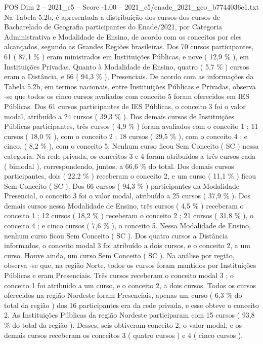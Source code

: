 \begin{textsample}{POS Dim 2 – 2021\_c5 – Score -1.00 – 2021\_c5/enade\_2021\_geo\_b7744036e1.txt}
Na Tabela 5.2b, é apresentada a distribuição dos cursos dos cursos de Bacharelado de Geografia participantes do Enade/2021, por Categoria Administrativa e Modalidade de Ensino, de acordo com os conceitos por eles alcançados, segundo as Grandes Regiões brasileiras.
Dos 70 cursos participantes, 61 ( 87,1 \% ) eram ministrados em Instituições Públicas, e nove ( 12,9 \% ), em Instituições Privadas.
Quanto à Modalidade de Ensino, quatro ( 5,7 \% ) cursos eram a Distância, e 66 ( 94,3 \% ), Presenciais.
De acordo com as informações da Tabela 5.2b, em termos nacionais, entre Instituições Públicas e Privadas, observa -se que todos os cinco cursos avaliados com conceito 5 foram oferecidos em IES Públicas.
Dos 61 cursos participantes de IES Públicas, o conceito 3 foi o valor modal, atribuído a 24 cursos ( 39,3 \% ).
Dos demais cursos de Instituições Públicas participantes, três cursos ( 4,9 \% ) foram avaliados com o conceito 1 ; 11 cursos ( 18,0 \% ), com o conceito 2 ; 18 cursos ( 29,5 \% ), com o conceito 4 ; e cinco, ( 8,2 \% ), com o conceito 5.
Nenhum curso ficou Sem Conceito ( SC ) nessa categoria.
Na rede privada, os conceitos 3 e 4 foram atribuídos a três cursos cada ( bimodal ), correspondendo, juntos, a 66,6 \% do total.
Dos demais cursos participantes, dois ( 22,2 \% ) receberam o conceito 2, e um curso ( 11,1 \% ) ficou Sem Conceito ( SC ).
Dos 66 cursos ( 94,3 \% ) participantes da Modalidade Presencial, o conceito 3 foi o valor modal, atribuído a 25 cursos ( 37,9 \% ).
Dos demais cursos nessa Modalidade de Ensino, três cursos ( 4,5 \% ) receberam o conceito 1 ; 12 cursos ( 18,2 \% ) receberam o conceito 2 ; 21 cursos ( 31,8 \% ), o conceito 4 ; e cinco cursos ( 7,6 \% ), o conceito 5.
Nessa Modalidade de Ensino, nenhum curso ficou Sem Conceito ( SC ).
Dos quatro cursos a Distância informados, o conceito modal 3 foi atribuído a dois cursos, e o conceito 2, a um curso.
Houve ainda, um curso Sem Conceito ( SC ).
Na análise por região, observa -se que, na região Norte, todos os cursos foram mantidos por Instituições Públicas e eram Presenciais.
Três cursos receberam o conceito modal 3 ; o conceito 1 foi atribuído a um curso, e o conceito 2, a dois cursos.
Todos os cursos oferecidos na região Nordeste foram Presenciais, apenas um curso ( 6,3 \% do total da região ) dos 16 participantes era da rede privada, e esse obteve o conceito 2.
As Instituições Públicas da região Nordeste participaram com 15 cursos ( 93,8 \% do total da região ).
Desses, seis obtiveram conceito 2, o valor modal, e os demais cursos receberam os conceitos 3 ( quatro cursos ) e 4 ( cinco cursos ).

\end{textsample}
